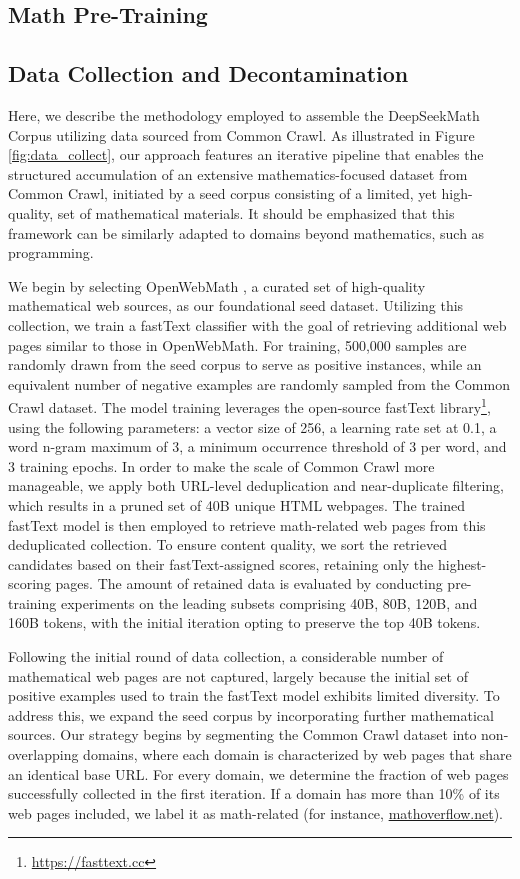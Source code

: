 \begin{itemize}[topsep=0pt]
\section{Math Pre-Training}

\subsection{Data Collection and Decontamination} Here, we describe the methodology employed to assemble the DeepSeekMath Corpus utilizing data sourced from Common Crawl. As illustrated in Figure \ref{fig:data_collect}, our approach features an iterative pipeline that enables the structured accumulation of an extensive mathematics-focused dataset from Common Crawl, initiated by a seed corpus consisting of a limited, yet high-quality, set of mathematical materials. It should be emphasized that this framework can be similarly adapted to domains beyond mathematics, such as programming.

We begin by selecting OpenWebMath \citep{openwebmath}, a curated set of high-quality mathematical web sources, as our foundational seed dataset. Utilizing this collection, we train a fastText classifier \citep{joulin2016fasttext} with the goal of retrieving additional web pages similar to those in OpenWebMath. For training, 500,000 samples are randomly drawn from the seed corpus to serve as positive instances, while an equivalent number of negative examples are randomly sampled from the Common Crawl dataset. The model training leverages the open-source fastText library\footnote{\url{https://fasttext.cc}}, using the following parameters: a vector size of 256, a learning rate set at 0.1, a word n-gram maximum of 3, a minimum occurrence threshold of 3 per word, and 3 training epochs. In order to make the scale of Common Crawl more manageable, we apply both URL-level deduplication and near-duplicate filtering, which results in a pruned set of 40B unique HTML webpages. The trained fastText model is then employed to retrieve math-related web pages from this deduplicated collection. To ensure content quality, we sort the retrieved candidates based on their fastText-assigned scores, retaining only the highest-scoring pages. The amount of retained data is evaluated by conducting pre-training experiments on the leading subsets comprising 40B, 80B, 120B, and 160B tokens, with the initial iteration opting to preserve the top 40B tokens.

Following the initial round of data collection, a considerable number of mathematical web pages are not captured, largely because the initial set of positive examples used to train the fastText model exhibits limited diversity. To address this, we expand the seed corpus by incorporating further mathematical sources. Our strategy begins by segmenting the Common Crawl dataset into non-overlapping domains, where each domain is characterized by web pages that share an identical base URL. For every domain, we determine the fraction of web pages successfully collected in the first iteration. If a domain has more than 10\% of its web pages included, we label it as math-related (for instance, \url{mathoverflow.net}). 


\end{itemize}
